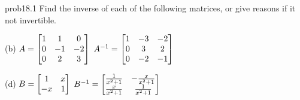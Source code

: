 

\begin{sol}{prob18.1} Find the inverse of each of the following matrices, or give reasons if it not invertible.
\medskip

(b) $A=\bmatrix1&1&0\\
0&-1&-2\\
0&2&3\endbmatrix$
\soln  $A^{-1}=\bmatrix 1 & -3 & -2 \\0 & 3 & 2 \\0 & -2 & -1 \endbmatrix$
\medskip

(d) $B=\bmatrix  1&x\\ -x&1\endbmatrix$
\medskip
\soln  $B^{-1}=\bmatrix\frac{1}{x^2+1} & -\frac{x}{x^2+1} \\\frac{x}{x^2+1} & \frac{1}{x^2+1} \endbmatrix$

 
\end{sol}

